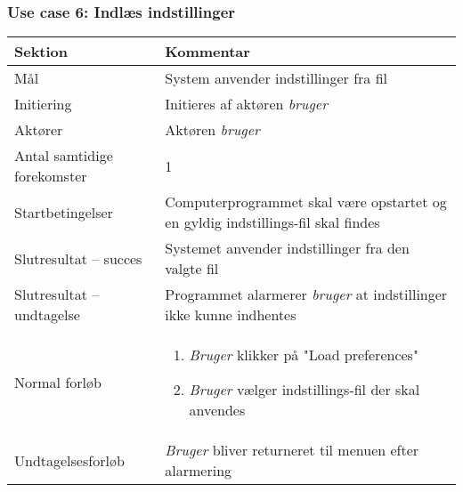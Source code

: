 \documentclass[kravspec.tex]{subfiles}
\begin{document}
	\subsubsection{Use case 6: Indlæs indstillinger}
	\begin{tabular}{|l|p{7.7cm}|}
		\hline \textbf{Sektion} 	& \textbf{Kommentar} \\ 
		\hline Mål  & System anvender indstillinger fra fil \\ 
		\hline Initiering  & Initieres af aktøren \textit{bruger} \\ 
		\hline Aktører & Aktøren \textit{bruger} \\ 
		\hline Antal samtidige forekomster & 1 \\ 
		\hline Startbetingelser & Computerprogrammet skal være opstartet og en gyldig indstillings-fil skal findes  \\ 
		\hline Slutresultat – succes & Systemet anvender indstillinger fra den valgte fil \\ 
		\hline Slutresultat – undtagelse & Programmet alarmerer \textit{bruger} at indstillinger ikke kunne indhentes \\ 
		\hline Normal forløb & \begin{enumerate}
			\item \textit{Bruger} klikker på "Load preferences"
			\item \textit{Bruger} vælger indstillings-fil der skal anvendes
		\end{enumerate} \\ 
		\hline Undtagelsesforløb & \textit{Bruger} bliver returneret til menuen efter alarmering \\ 
		\hline 
	\end{tabular}
	
\end{document}
